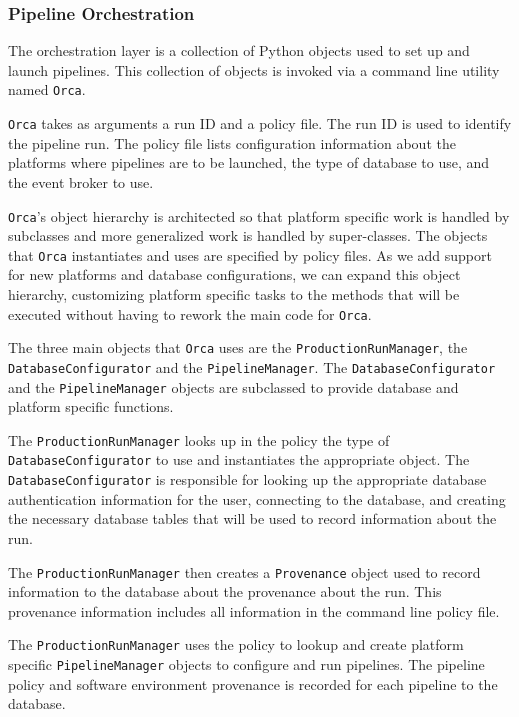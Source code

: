 
\subsubsection{Pipeline Orchestration} \label{sec:PipelineOrchestration}

The orchestration layer is a collection of Python objects used to set up and
launch pipelines. This collection of objects is invoked via a command line
utility named \texttt{Orca}.

\texttt{Orca} takes as arguments a run ID and a policy file. The run ID is used
to identify the pipeline run. The policy file lists configuration information
about the platforms where pipelines are to be launched, the type of database to
use, and the event broker to use.

\texttt{Orca}'s object hierarchy is architected so that platform specific work
is handled by subclasses and more generalized work is handled by super-classes.
The objects that \texttt{Orca} instantiates and uses are specified by policy
files. As we add support for new platforms and database configurations, we can
expand this object hierarchy, customizing platform specific tasks to the methods
that will be executed without having to rework the main code for \texttt{Orca}.

The three main objects that \texttt{Orca} uses are the
\texttt{ProductionRunManager}, the \texttt{DatabaseConfig\-urator} and the
\texttt{PipelineManager}.  The \texttt{DatabaseConfigurator} and the
\texttt{PipelineManager} objects are subclassed to provide database and platform
specific functions.

The \texttt{ProductionRunManager} looks up in the policy the type of
\texttt{DatabaseConfigurator} to use and instantiates the appropriate object.
The \texttt{DatabaseConfigurator} is responsible for looking up the appropriate
database authentication information for the user, connecting to the database,
and creating the necessary database tables that will be used to record
information about the run.

The \texttt{ProductionRunManager} then creates a \texttt{Provenance} object used
to record information to the database about the provenance about the run. This
provenance information includes all information in the command line policy file.

The \texttt{ProductionRunManager} uses the policy to lookup and create platform
specific \texttt{Pipeline\-Manager} objects to configure and run pipelines. The
pipeline policy and software environment provenance is recorded for each
pipeline to the database.

